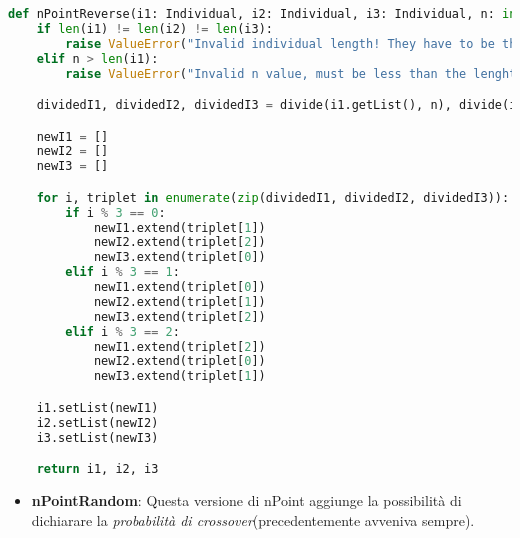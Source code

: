 \documentclass{article}
\begin{document}
\begin{lstlisting}[language=Python]
def nPointReverse(i1: Individual, i2: Individual, i3: Individual, n: int) -> tuple[Individual, Individual, Individual]:
    if len(i1) != len(i2) != len(i3):
        raise ValueError("Invalid individual length! They have to be the same.")
    elif n > len(i1):
        raise ValueError("Invalid n value, must be less than the lenght of the individual!")

    dividedI1, dividedI2, dividedI3 = divide(i1.getList(), n), divide(i2.getList(), n), divide(i3.getList(), n)

    newI1 = []
    newI2 = []
    newI3 = []

    for i, triplet in enumerate(zip(dividedI1, dividedI2, dividedI3)):
        if i % 3 == 0:
            newI1.extend(triplet[1])
            newI2.extend(triplet[2])
            newI3.extend(triplet[0])
        elif i % 3 == 1:
            newI1.extend(triplet[0])
            newI2.extend(triplet[1])
            newI3.extend(triplet[2])
        elif i % 3 == 2:
            newI1.extend(triplet[2])
            newI2.extend(triplet[0])
            newI3.extend(triplet[1])

    i1.setList(newI1)
    i2.setList(newI2)
    i3.setList(newI3)

    return i1, i2, i3
        \end{lstlisting}

        \pagebreak

\begin{itemize}
\item\textbf{nPointRandom}: Questa versione di nPoint aggiunge la possibilità di dichiarare la \textit{probabilità di crossover}(precedentemente avveniva sempre).
\end{itemize}
\end{document}
